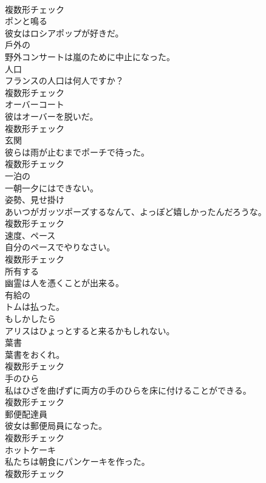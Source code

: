 \documentclass[8pt]{extreport}
\begin{document}
\begin{CJK}{UTF8}{min}
\\	複数形チェック
\\	[動詞]	ポンと鳴る	
\\	彼女はロシアポップが好きだ。	
\\	[形容詞]	戶外の	
\\	野外コンサートは嵐のために中止になった。	
\\	[名詞]	人口	
\\	フランスの人口は何人ですか？	
\\	複数形チェック
\\	[名詞]	オーバーコート	
\\	彼はオーバーを脱いだ。	
\\	複数形チェック
\\	[名詞]	玄関	
\\	彼らは雨が止むまでポーチで待った。	
\\	複数形チェック
\\	[形容詞]	一泊の	
\\	一朝一夕にはできない。	
\\	[名詞]	姿勢、見せ掛け	
\\	あいつがガッツポーズするなんて、よっぽど嬉しかったんだろうな。	
\\	複数形チェック
\\	[名詞]	速度、ペース	
\\	自分のペースでやりなさい。	
\\	複数形チェック
\\	[動詞]	所有する	
\\	幽霊は人を憑くことが出来る。	
\\	[形容詞]	有給の	
\\	トムは払った。	
\\	[副詞]	もしかしたら	
\\	アリスはひょっとすると来るかもしれない。	
\\	[名詞]	葉書	
\\	葉書をおくれ。	
\\	複数形チェック
\\	[名詞]	手のひら	
\\	私はひざを曲げずに両方の手のひらを床に付けることができる。	
\\	複数形チェック
\\	[名詞]	郵便配達員	
\\	彼女は郵便局員になった。	
\\	複数形チェック
\\	[名詞]	ホットケーキ	
\\	私たちは朝食にパンケーキを作った。	
\\	複数形チェック

\end{CJK}
\end{document}
